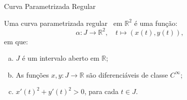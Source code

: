 \begin{frame}{Curva Parametrizada Regular}
  \begin{definition}\label{def:curva-parametrizada-regular}
    Uma curva parametrizada regular~\cite{lamport1994document} em
    \(\mathbb{R}^{2}\) é uma função:
    \[
      \alpha:J\to{\mathbb{R}^{2}},\quad
      t\mapsto(x(t),y(t)),
    \]
    em que:
    \begin{enumerate}[a)]
      \item
        \(J\) é um intervalo aberto em \(\mathbb{R}\);
      \item
        As funções \(x,y:J\to\mathbb{R}\) são diferenciáveis de classe
        \(C^{\infty}\);
      \item
        \(x'(t)^{2}+y'(t)^{2}>0\), para cada \({t}\in{J}\).
    \end{enumerate}
  \end{definition}
\end{frame}
